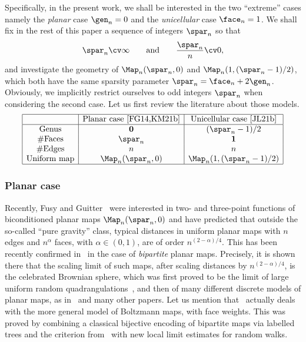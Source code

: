 Specifically, in the present work, we shall be interested in the two ``extreme'' cases namely the \emph{planar} case $ \gen_n=0$ and the \emph{unicellular} case $ \face_n = 1$. We shall fix in the rest of this paper a sequence of integers $\spar_n$ so that
\begin{equation}\label{eq:standing}
\spar_n \cv \infty \qquad \text{and} \qquad \frac{\spar_n}{n} \cv 0,
\end{equation}
and investigate the geometry of $ \Map_n{(\spar_n,0)}$ and $ \Map_n{(1, (\spar_n-1)/2)}$, which both have the same sparsity parameter $\spar_n = \face_n + 2 \gen_n$.
Obviously, we implicitly restrict ourselves to odd integers $\spar_n$ when considering the second case.
Let us first review the literature about those models.
\[
\begin{array}{|c|c|c|}
\hline
& \mbox{Planar case~\cite{FG14,KM21b}} & \mbox{Unicellular case~\cite{JL21b}} \\
\hline
\mbox{Genus} & \mathbf{0} & (\spar_n-1)/2 \\
\#\mbox{Faces} & \spar_n & \mathbf{1} \\
\#\mbox{Edges} & n & n \\
\mbox{Uniform map} & \Map_n(\spar_n,0) & \displaystyle \Map_n(1, (\spar_n-1)/2)\\
\hline
\end{array}
\]

\subsubsection*{Planar case} Recently, Fusy and Guitter~\cite{FG14} were interested in two- and three-point functions of biconditioned planar maps $ \Map_n(\spar_n,0)$ and have predicted that outside the so-called ``pure gravity'' class, typical distances in uniform planar maps with $n$ edges and $n^\alpha$ faces, with $\alpha \in (0,1)$, are of order $n^{(2-\alpha)/4}$. This has been recently confirmed in~\cite{KM21b} in the case of \emph{bipartite} planar maps.
Precisely, it is shown there that the scaling limit of such maps, after scaling distances by $n^{(2- \alpha)/4}$, is the celebrated Brownian sphere, which was first proved to be the limit of large uniform random quadrangulations~\cite{LG13, Mie13}, and then of many different discrete models of planar maps, as in~\cite{ABA21,BJM14,NR18,CLG19,Mar22}
and many other papers. Let us mention that~\cite{KM21b} actually deals with the more general model of Boltzmann maps, with face weights. This was proved by combining a classical bijective encoding of bipartite maps via labelled trees and the criterion from~\cite{Mar22} with new local limit estimates for random walks.

